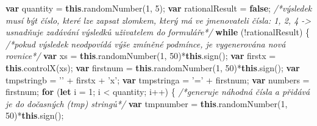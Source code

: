 \documentclass[
]{article}
\newenvironment{Shaded}{}{}
\newcommand{\AttributeTok}[1]{\textcolor[rgb]{0.49,0.56,0.16}{#1}}
\newcommand{\CommentTok}[1]{\textcolor[rgb]{0.38,0.63,0.69}{\textit{#1}}}
\newcommand{\ControlFlowTok}[1]{\textcolor[rgb]{0.00,0.44,0.13}{\textbf{#1}}}
\newcommand{\DecValTok}[1]{\textcolor[rgb]{0.25,0.63,0.44}{#1}}
\newcommand{\KeywordTok}[1]{\textcolor[rgb]{0.00,0.44,0.13}{\textbf{#1}}}
\newcommand{\NormalTok}[1]{#1}
\newcommand{\OperatorTok}[1]{\textcolor[rgb]{0.40,0.40,0.40}{#1}}
\newcommand{\StringTok}[1]{\textcolor[rgb]{0.25,0.44,0.63}{#1}}
\begin{document}
\begin{Shaded}
\begin{Highlighting}[]
                \KeywordTok{var}\NormalTok{ quantity }\OperatorTok{=} \KeywordTok{this}\NormalTok{.}\AttributeTok{randomNumber}\NormalTok{(}\DecValTok{1}\OperatorTok{,} \DecValTok{5}\NormalTok{)}\OperatorTok{;}
                \KeywordTok{var}\NormalTok{ rationalResult }\OperatorTok{=} \KeywordTok{false}\OperatorTok{;} \CommentTok{/*výsledek musí být číslo, které lze zapsat }
\CommentTok{                zlomkem, který má ve jmenovateli čísla: 1, 2, 4 -> usnadňuje zadávání }
\CommentTok{                výsledků uživatelem do formuláře*/}
                \ControlFlowTok{while}\NormalTok{ (}\OperatorTok{!}\NormalTok{rationalResult) }\OperatorTok{\{} \CommentTok{/*pokud výsledek neodpovídá výše zmíněné }
\CommentTok{                    podmínce, je vygenerována nová rovnice*/}
                    \KeywordTok{var}\NormalTok{ xs }\OperatorTok{=} \KeywordTok{this}\NormalTok{.}\AttributeTok{randomNumber}\NormalTok{(}\DecValTok{1}\OperatorTok{,} \DecValTok{50}\NormalTok{)}\OperatorTok{*}\KeywordTok{this}\NormalTok{.}\AttributeTok{sign}\NormalTok{()}\OperatorTok{;}
                    \KeywordTok{var}\NormalTok{ firstx }\OperatorTok{=} \KeywordTok{this}\NormalTok{.}\AttributeTok{controlX}\NormalTok{(xs)}\OperatorTok{;}
                    \KeywordTok{var}\NormalTok{ firstnum }\OperatorTok{=} \KeywordTok{this}\NormalTok{.}\AttributeTok{randomNumber}\NormalTok{(}\DecValTok{1}\OperatorTok{,} \DecValTok{50}\NormalTok{)}\OperatorTok{*}\KeywordTok{this}\NormalTok{.}\AttributeTok{sign}\NormalTok{()}\OperatorTok{;}
                    \KeywordTok{var}\NormalTok{ tmpstringb }\OperatorTok{=} \StringTok{'$$'} \OperatorTok{+}\NormalTok{ firstx }\OperatorTok{+} \StringTok{'x'}\OperatorTok{;} 
                    \KeywordTok{var}\NormalTok{ tmpstringa }\OperatorTok{=} \StringTok{'='} \OperatorTok{+}\NormalTok{ firstnum}\OperatorTok{;}
                    \KeywordTok{var}\NormalTok{ numbers }\OperatorTok{=}\NormalTok{ firstnum}\OperatorTok{;}
                    \ControlFlowTok{for}\NormalTok{ (}\KeywordTok{let}\NormalTok{ i }\OperatorTok{=} \DecValTok{1}\OperatorTok{;}\NormalTok{ i }\OperatorTok{<}\NormalTok{ quantity}\OperatorTok{;}\NormalTok{ i}\OperatorTok{++}\NormalTok{) }\OperatorTok{\{} \CommentTok{/*generuje náhodná čísla }
\CommentTok{                        a přidává je do dočasných (tmp) stringů*/}
                        \KeywordTok{var}\NormalTok{ tmpnumber }\OperatorTok{=} \KeywordTok{this}\NormalTok{.}\AttributeTok{randomNumber}\NormalTok{(}\DecValTok{1}\OperatorTok{,} \DecValTok{50}\NormalTok{)}\OperatorTok{*}\KeywordTok{this}\NormalTok{.}\AttributeTok{sign}\NormalTok{()}\OperatorTok{;}

\end{Highlighting}
\end{Shaded}
\end{document}
